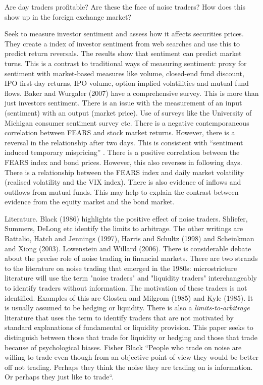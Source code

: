 \documentclass[12pt, a4paper, oneside]{article} %
\begin{document}
Are day traders profitable? Are these the face of noise traders?  How does this show up in the foreign exchange market? 


\citet{da2010sum} Seek to measure investor sentiment and assess how it affects securities prices. They create a index of investor sentiment from web searches and use this to predict return reversals.  The results show that sentiment can predict market turns. This is a contrast to traditional ways of measuring sentiment:  proxy for sentiment with market-based measures like volume, closed-end fund discount, IPO first-day returns, IPO volume, option implied volatilities and mutual fund flows. Baker and Wurgaler (2007) have a comprehensive survey. This is more than just investors sentiment. There is an issue with the measurement of an input (sentiment) with an output (market price). Use of surveys like the University of Michigan consumer sentiment survey etc.  There is a negative contemporaneous correlation between FEARS and stock market returns. However, there is a reversal in the relationship after two days.  This is consistent with ``sentiment induced temporary mispricing'' \citet[p. 4]{da2010sum}.  There is a positive correlation between the FEARS index and bond prices.  However, this also reverses in following days. There is a relationship between the FEARS index and daily market volatility (realised volatility and the VIX index). There is also evidence of inflows and outflows from mutual funds.  This may help to explain the contrast between evidence from the equity market and the bond market.  


Literature.  Black (1986) highlights the positive effect of noise traders. Shliefer, Summers, DeLong etc identify the limits to arbitrage. The other writings are Battalio, Hatch and Jennings (1997), Harris and Schultz (1998) and Scheinkman and Xiong (2003).  Lowenstein and Willard (2006).  There is considerable debate about the precise role of noise trading in financial markets. There are two strands to the literature on noise trading that emerged in the 1980s:  microstricture literature will use the term "noise traders" and "liquidity traders" interchangeably to identify traders without information.  The motivation of these traders is not identified. Examples of this are Glosten and Milgrom (1985) and Kyle (1985). It is usually assumed to be hedging or liquidity. There is also a \emph{limits-to-arbitrage} literature that uses the term to identify traders that are not motivated by standard explanations of fundamental or liquidity provision. This paper seeks to distinguish between those that trade for liquidity or hedging and those that trade because of psychological biases. Fisher Black ``People who trade on noise are willing to trade even though from an objective point of view they would be better off not trading. Perhaps they think the noise they are trading on is information. Or perhaps they just like to trade``.  
\end{document}
